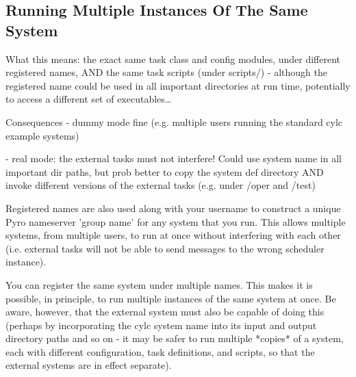 \documentclass[11pt,a4paper]{article}
\begin{document}
%

\subsection{Running Multiple Instances Of The Same System}
\label{RunningMultipleInstancesOfTheSameSystem}

What this means: the exact same task class and config modules, under
different registered names, AND the same task scripts (under scripts/)
- although the registered name could be used in all important
directories at run time, potentially to access a different set of 
executables\dots

Consequences - dummy mode fine (e.g. multiple users running the standard
cylc example systems)

             - real mode: the external tasks must not interfere! Could
             use system name in all important dir paths, but prob better 
             to copy the system def directory AND invoke different versions
             of the external tasks (e.g. under /oper and /test)

    Registered names are also used along with your username to construct
    a unique Pyro nameserver 'group name' for any system that you run.
    This allows multiple systems, from multiple users, to run at once
    without interfering with each other (i.e. external tasks will not
    be able to send messages to the wrong scheduler instance).
    
    You can register the same system under multiple names. This makes it
    is possible, in principle, to run multiple instances of the same
    system at once. Be aware, however, that the external system must
    also be capable of doing this (perhaps by incorporating the cylc
    system name into its input and output directory paths and so on - it
    may be safer to run multiple *copies* of a system, each with
    different configuration, task definitions, and scripts, so that the
    external systems are in effect separate).
\end{document}
